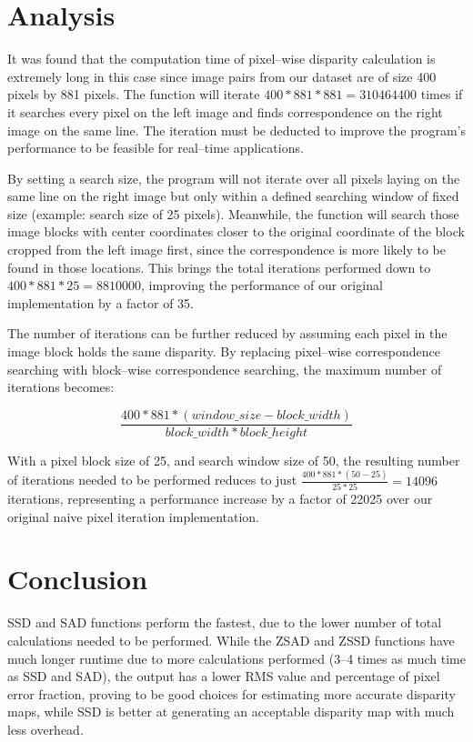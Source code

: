 \documentclass[conference]{IEEEtran}
\begin{document}
\section{Analysis}

It was found that the computation time of pixel--wise disparity calculation is extremely long in this case since image pairs from our dataset are of size 400 pixels by 881 pixels. The function will iterate $400*881*881=310464400$ times if it searches every pixel on the left image and finds correspondence on the right image on the same line. The iteration must be deducted to improve the program's performance to be feasible for real--time applications.

By setting a search size, the program will not iterate over all pixels laying on the same line on the right image but only within a defined searching window of fixed size (example: search size of 25 pixels). Meanwhile, the function will search those image blocks with center coordinates closer to the original coordinate of the block cropped from the left image first, since the correspondence is more likely to be found in those locations. This brings the total iterations performed down to $400*881*25=8810000$, improving the performance of our original implementation by a factor of 35.

The number of iterations can be further reduced by assuming each pixel in the image block holds the same disparity. By replacing pixel--wise correspondence searching with block--wise correspondence searching, the maximum number of iterations becomes:

\begin{equation*}
    \frac{400*881*(window\_size-block\_width)}{block\_width*block\_height}
\end{equation*}

With a pixel block size of 25, and search window size of 50, the resulting number of iterations needed to be performed reduces to just $\frac{400*881*(50-25)}{25*25}=14096$ iterations, representing a performance increase by a factor of 22025 over our original naive pixel iteration implementation.

\vspace{4pt}
\section{Conclusion}

SSD and SAD functions perform the fastest, due to the lower number of total calculations needed to be performed. While the ZSAD and ZSSD functions have much longer runtime due to more calculations performed (3--4 times as much time as SSD and SAD), the output has a lower RMS value and percentage of pixel error fraction, proving to be good choices for estimating more accurate disparity maps, while SSD is better at generating an acceptable disparity map with much less overhead. 
\end{document}

